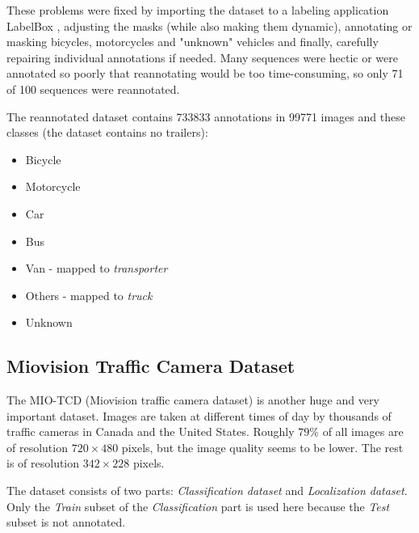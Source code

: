 These problems were fixed by importing the dataset to a labeling application
LabelBox \cite{labelbox}, adjusting the masks (while also making them dynamic),
annotating or masking bicycles, motorcycles and "unknown" vehicles and finally,
carefully repairing individual annotations if needed. Many sequences were hectic
or were annotated so poorly that reannotating would be too time-consuming, so
only 71 of 100 sequences were reannotated.

The reannotated dataset contains \num{733833} annotations in \num{99771}
images and these classes (the dataset contains no trailers):
\begin{itemize}
    \item Bicycle
    \item Motorcycle
    \item Car
    \item Bus
    \item Van - mapped to \textit{transporter}
    \item Others - mapped to \textit{truck}
    \item Unknown
\end{itemize}


\subsection*{Miovision Traffic Camera Dataset}

The MIO-TCD (Miovision traffic camera dataset) \cite{MIO2018} is another huge
and very important dataset. Images are taken at different times of day by
thousands of traffic cameras in Canada and the United States. Roughly $79\%$ of
all images are of resolution $720 \times 480$ pixels, but the image quality
seems to be lower. The rest is of resolution $342 \times 228$ pixels. 

The dataset consists of two parts: \textit{Classification dataset} and
\textit{Localization dataset}. Only the \textit{Train} subset of the
\textit{Classification} part is used here because the \textit{Test} subset is
not annotated.

